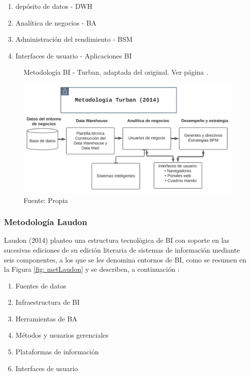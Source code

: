 \documentclass[12pt,jou]{apa7}
\begin{document}
\begin{enumerate}
\item depósito de datos - DWH
\item Analítica de negocios - BA
\item Administración del rendimiento - BSM
\item Interfaces de usuario - Aplicaciones BI
\end{enumerate}

\begin{figure}[h]
\caption{Metodología BI - Turban, adaptada del original. Ver página \pageref{Met_Turban}.}
\centering
\includegraphics[width=1\linewidth]{Figuras/Met_Turban}
\caption*{ Fuente: Propia}
\label{fig: metTurban}
\end{figure}

\subsubsection{Metodología Laudon}
Laudon (2014) planteo una estructura tecnológica de BI con soporte en las sucesivas ediciones de su edición literaria de sistemas de información mediante seis componentes, a los que se les denomina entornos de BI, como se resumen en la Figura \ref{fig: metLaudon} y se describen, a continuación \cite{Joyanes}:
\begin{enumerate}
\item Fuentes de datos 
\item Infraestructura de BI
\item Herramientas de BA
\item Métodos y usuarios gerenciales
\item Plataformas de información
\item Interfaces de usuario
\end{enumerate}
\end{document}
